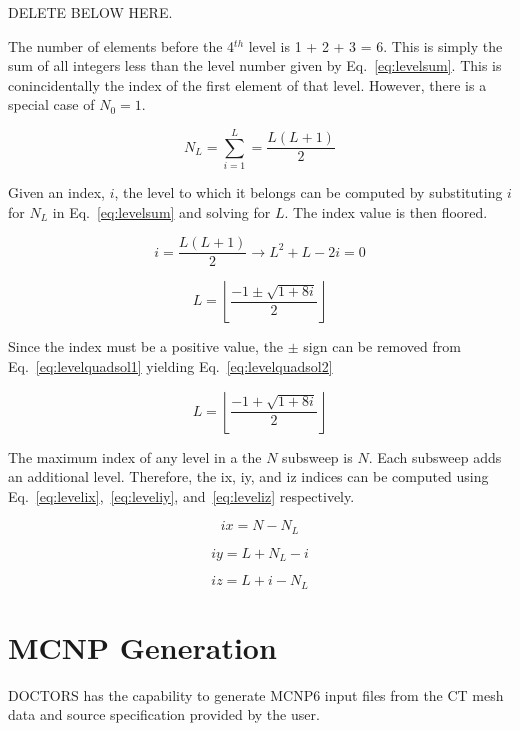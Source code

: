 DELETE BELOW HERE.

The number of elements before the 4$^{th}$ level is 1 + 2 + 3 = 6. This is simply the sum of all integers less than the level number given by Eq.~\ref{eq:levelsum}. This is conincidentally the index of the first element of that level. However, there is a special case of $N_0 = 1$.

\begin{equation} \label{eq:levelsum}
N_L = \sum_{i=1}^{L} = \frac{L(L+1)}{2}
\end{equation}

Given an index, $i$, the level to which it belongs can be computed by substituting $i$ for $N_L$ in Eq.~\ref{eq:levelsum} and solving for $L$. The index value is then floored.

\begin{equation} \label{eq:levelquadratic}
i = \frac{L(L+1)}{2} \rightarrow L^2 + L - 2i = 0
\end{equation}

\begin{equation} \label{eq:levelquadsol1}
L = \left \lfloor{\frac{-1 \pm \sqrt{1+8i}}{2}} \right \rfloor
\end{equation}

Since the index must be a positive value, the $\pm$ sign can be removed from Eq.~\ref{eq:levelquadsol1} yielding Eq.~\ref{eq:levelquadsol2}

\begin{equation} \label{eq:levelquadsol2}
L = \left \lfloor{\frac{-1 + \sqrt{1+8i}}{2}} \right \rfloor
\end{equation}

The maximum index of any level in a the $N$ subsweep is $N$. Each subsweep adds an additional level. Therefore, the ix, iy, and iz indices can be computed using Eq.~\ref{eq:levelix},~\ref{eq:leveliy}, and~\ref{eq:leveliz} respectively.

\begin{equation} \label{eq:levelix}
ix = N - N_L
\end{equation}

\begin{equation} \label{eq:leveliy}
iy = L + N_L - i
\end{equation}

\begin{equation} \label{eq:leveliz}
iz = L + i - N_L
\end{equation}

\section{MCNP Generation}\label{sec:mcnpgen}
DOCTORS has the capability to generate MCNP6 input files from the CT mesh data and source specification provided by the user.

